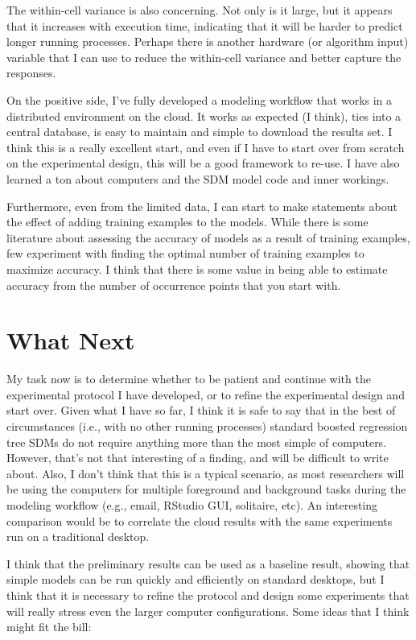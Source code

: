 \documentclass[a4paper]{article}
\begin{document}
The within-cell variance is also concerning.  Not only is it large, but it appears that it increases with execution time, indicating that it will be harder to predict longer running processes.  Perhaps there is another hardware (or algorithm input) variable that I can use to reduce the within-cell variance and better capture the responses.  

On the positive side, I've fully developed a modeling workflow that works in a distributed environment on the cloud.  It works as expected (I think), ties into a central database, is easy to maintain and simple to download the results set.   I think this is a really excellent start, and even if I have to start over from scratch on the experimental design, this will be a good framework to re-use.  I have also learned a ton about computers and the SDM model code and inner workings.  

Furthermore, even from the limited data, I can start to make statements about the effect of adding training examples to the models.  While there is some literature about assessing the accuracy of models as a result of training examples, few experiment with finding the optimal number of training examples to maximize accuracy.  I think that there is some value in being able to estimate accuracy from the number of occurrence points that you start with.

\section{What Next}
My task now is to determine whether to be patient and continue with the experimental protocol I have developed, or to refine the experimental design and start over.  Given what I have so far, I think it is safe to say that in the best of circumstances (i.e., with no other running processes) standard boosted regression tree SDMs do not require anything more than the most simple of computers.  However, that's not that interesting of a finding, and will be difficult to write about.  Also, I don't think that this is a typical scenario, as most researchers will be using the computers for multiple foreground and background tasks during the modeling workflow (e.g., email, RStudio GUI, solitaire, etc). An interesting comparison would be to correlate the cloud results with the same experiments run on a traditional desktop.

 I think that the preliminary results can be used as a baseline result, showing that simple models can be run quickly and efficiently on standard desktops, but I think that it is necessary to refine the protocol and design some experiments that will really stress even the larger computer configurations.  Some ideas that I think might fit the bill:
 
\end{document}
